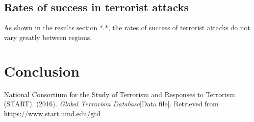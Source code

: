 \documentclass[10pt,a4paper]{article}
\begin{document}
\subsection{Rates of success in terrorist attacks}
As shown in the results section *.*, the rates of success of terrorist attacks do not vary greatly between regions.

\section{Conclusion} 


\pagebreak
\begin{thebibliography}{9}

National Consortium for the Study of Terrorism and Responses to Terrorism (START). 
(2016). \textit{Global Terrorism Database}[Data file].
Retrieved from https://www.start.umd.edu/gtd

\end{thebibliography}
\end{document}
